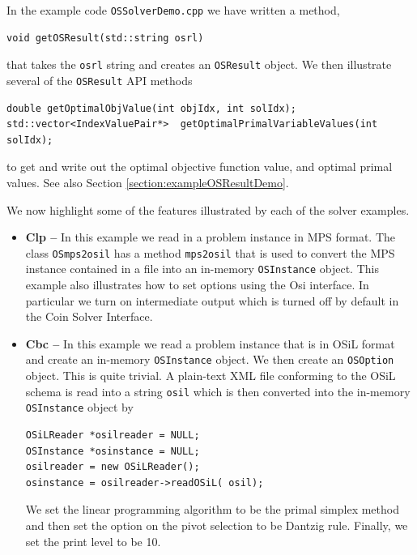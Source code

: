 \documentclass[11pt]{article}
\renewcommand{\_}{{\char"5F}}
\renewcommand{\{}{{\char"7B}}
\renewcommand{\}}{{\char"7D}}
\renewcommand{\^}{{\char"0D}}
\renewcommand{\'}{{\char"0D}}
\begin{document}
\begin{enumerate}[Step 1:]
\begin{itemize}
In the example code {\tt OSSolverDemo.cpp} we have written a method,  

\begin{verbatim}
void getOSResult(std::string osrl)
\end{verbatim}

that takes the {\tt osrl} string and creates an {\tt OSResult} object.   
We then illustrate several of the {\tt OSResult} API methods 

\begin{verbatim}
double getOptimalObjValue(int objIdx, int solIdx);
std::vector<IndexValuePair*>  getOptimalPrimalVariableValues(int solIdx);
\end{verbatim}
to get and write out the optimal objective function value, and optimal primal values.  See also Section \ref{section:exampleOSResultDemo}.

\end{itemize}

We now highlight some of the features illustrated by each of the solver examples.

\begin{itemize}
\item {\bf Clp --}  In this example we read in a problem instance in MPS format.  The class 
{\tt OSmps2osil}  has a method {\tt mps2osil} that is used to convert the MPS instance contained 
in a file into an in-memory {\tt OSInstance} object. This example also illustrates how to 
set options using the Osi interface. In particular we turn on intermediate output which is 
turned off by default in the Coin Solver Interface. 

\item {\bf Cbc --}  In this example we read a problem instance that is in OSiL format and create 
an in-memory {\tt OSInstance} object.  We then create an {\tt OSOption} object.  This is quite trivial.  
A  plain-text XML file conforming to the OSiL schema is read into a string {\tt osil} which is then 
converted into the in-memory {\tt OSInstance} object by

\begin{verbatim}
OSiLReader *osilreader = NULL;
OSInstance *osinstance = NULL;
osilreader = new OSiLReader(); 
osinstance = osilreader->readOSiL( osil);
\end{verbatim}


 We set the linear programming algorithm to be the primal simplex method and then set the option 
on the pivot selection to be Dantzig rule.  Finally, we set the print level to be 10.


\end{itemize}
\end{enumerate}
\end{document}
